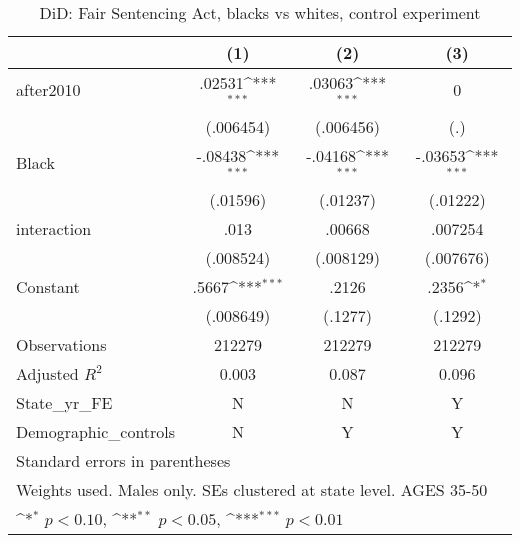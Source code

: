 \begin{table}[htbp]\centering
\def\sym#1{\ifmmode^{#1}\else\(^{#1}\)\fi}
\caption{DiD: Fair Sentencing Act, blacks vs whites, control experiment}
\begin{tabular}{l*{3}{c}}
\hline\hline
                    &\multicolumn{1}{c}{(1)}         &\multicolumn{1}{c}{(2)}         &\multicolumn{1}{c}{(3)}         \\
\hline
after2010           &      .02531\sym{***}&      .03063\sym{***}&           0         \\
                    &   (.006454)         &   (.006456)         &         (.)         \\
[1em]
Black               &     -.08438\sym{***}&     -.04168\sym{***}&     -.03653\sym{***}\\
                    &    (.01596)         &    (.01237)         &    (.01222)         \\
[1em]
interaction         &        .013         &      .00668         &     .007254         \\
                    &   (.008524)         &   (.008129)         &   (.007676)         \\
[1em]
Constant            &       .5667\sym{***}&       .2126         &       .2356\sym{*}  \\
                    &   (.008649)         &     (.1277)         &     (.1292)         \\
\hline
Observations        &      212279         &      212279         &      212279         \\
Adjusted \(R^{2}\)  &       0.003         &       0.087         &       0.096         \\
State\_yr\_FE         &           N         &           N         &           Y         \\
Demographic\_controls&           N         &           Y         &           Y         \\
\hline\hline
\multicolumn{4}{l}{\footnotesize Standard errors in parentheses}\\
\multicolumn{4}{l}{\footnotesize Weights used. Males only. SEs clustered at state level. AGES 35-50}\\
\multicolumn{4}{l}{\footnotesize \sym{*} \(p<0.10\), \sym{**} \(p<0.05\), \sym{***} \(p<0.01\)}\\
\end{tabular}
\end{table}
